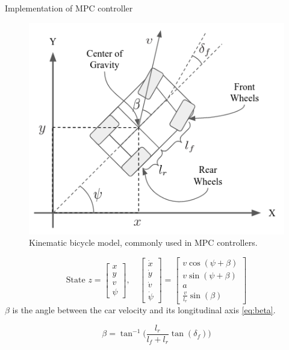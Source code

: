 \documentclass{beamer}
\begin{document}
\begin{frame}{Implementation of MPC controller}
\begin{figure}
	\includegraphics[width=0.38\linewidth]{figures/kinematic_diagram.png}
	\caption{Kinematic bicycle model, commonly used in MPC controllers.}
\end{figure}
\vspace{-0.5em}
\begin{equation}
\text{State } z = \begin{bmatrix}
x\\y\\v\\\psi
\end{bmatrix},\quad \begin{bmatrix}
\dot x\\\dot y\\\dot v\\\dot\psi
\end{bmatrix} = \begin{bmatrix}
v\cos(\psi + \beta)\\
v\sin(\psi + \beta)\\
a\\
\frac{v}{l_r}\sin(\beta)
\end{bmatrix}
\label{eq:kinematic}
\end{equation}
$\beta$ is the angle between the car velocity and its longitudinal axis \eqref{eq:beta}.

\begin{equation}
\beta = \tan^{-1}\Big( \frac{l_r}{l_f + l_r}\tan(\delta_f) \Big)
\label{eq:beta}
\end{equation}
\end{frame}
\end{document}
